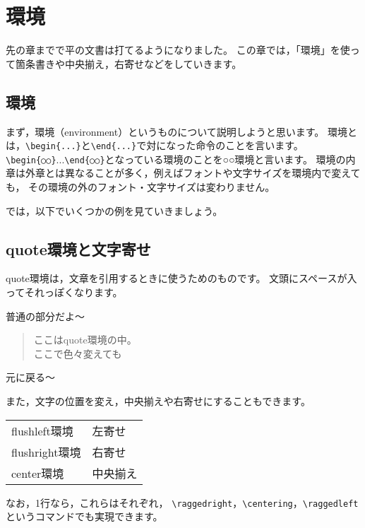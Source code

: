 \documentclass[class=jreport, crop=false, preview=false, dvipdfmx, fleqn]{standalone}
\begin{document}
\chapter{環境}

先の章までで平の文書は打てるようになりました。
この章では，「環境」を使って箇条書きや中央揃え，右寄せなどをしていきます。



\section{環境}
まず，環境（environment）というものについて説明しようと思います。
環境とは，\verb|\begin{...}|と\verb|\end{...}|で対になった命令のことを言います。
\verb|\begin{○○}|...\verb|\end{○○}|となっている環境のことを○○環境と言います。
環境の内章は外章とは異なることが多く，例えばフォントや文字サイズを環境内で変えても，
その環境の外のフォント・文字サイズは変わりません。

では，以下でいくつかの例を見ていきましょう。



\section{quote環境と文字寄せ}
quote環境は，文章を引用するときに使うためのものです。
文頭にスペースが入ってそれっぽくなります。

\begin{IOTeX}
普通の部分だよ～
\begin{quote}
ここはquote環境の中。\\
\tiny ここで色々変えても
\end{quote}
元に戻る～
\end{IOTeX}


また，文字の位置を変え，中央揃えや右寄せにすることもできます。

\begin{center}
\begin{tabular}{ll}
flushleft環境 & 左寄せ \\
flushright環境 & 右寄せ \\
center環境 & 中央揃え
\end{tabular}
\end{center}

なお，1行なら，これらはそれぞれ，
\verb|\raggedright|，\verb|\centering|，\verb|\raggedleft|
というコマンドでも実現できます。
\end{document}
